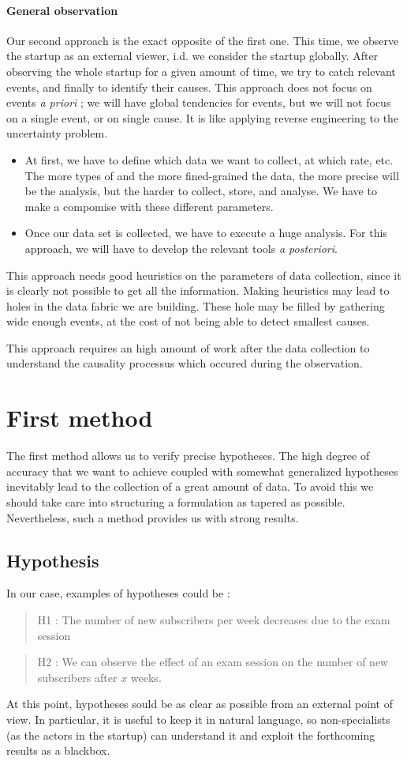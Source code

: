 \documentclass[twoside]{report}
\begin{document}
	\paragraph{General observation}Our second approach is the exact opposite of the first one. This time, we observe the startup as an external viewer, i.d. we consider the startup globally. After observing the whole startup for a given amount of time, we try to catch relevant events, and finally to identify their causes. This approach does not focus on events \emph{a priori} ; we will have global tendencies for events, but we will not focus on a single event, or on single cause. It is like applying reverse engineering to the uncertainty problem. 
	\begin{itemize}
		\item At first, we have to define which data we want to collect, at which rate, etc. The more types of and the more fined-grained the data, the more precise will be the analysis, but the harder to collect, store, and analyse. We have to make a compomise with these different parameters.
		\item Once our data set is collected, we have to execute a huge analysis. For this approach, we will have to develop the relevant tools \emph{a posteriori}. 
	\end{itemize}
	This approach needs good heuristics on the parameters of data collection, since it is clearly not possible to get all the information. Making heuristics may lead to holes in the data fabric we are building. These hole may be filled by gathering wide enough events, at the cost of not being able to detect smallest causes.

	This approach requires an high amount of work after the data collection to understand the causality processus which occured during the observation.
	\section{First method}
	\label{ch:first_method}
	The first method allows us to verify precise hypotheses. The high degree of accuracy that we want to achieve coupled with somewhat generalized hypotheses inevitably lead to the collection of a great amount of data. To avoid this we should take care into structuring a formulation as tapered as possible. Nevertheless, such a method provides us with strong results. 
	\subsection{Hypothesis}
	In our case, examples of hypotheses could be :
	\begin{quote}{H1 : }
		The number of new subscribers per week decreases due to the exam session
	\end{quote}
	\begin{quote}{H2 : }
		We can observe the effect of an exam session on the number of new subscribers after $x$ weeks.
	\end{quote}
	At this point, hypotheses sould be as clear as possible from an external point of view. In particular, it is useful to keep it in natural language, so non-specialists (as the actors in the startup) can understand it and exploit the forthcoming results as a blackbox.
\end{document}

